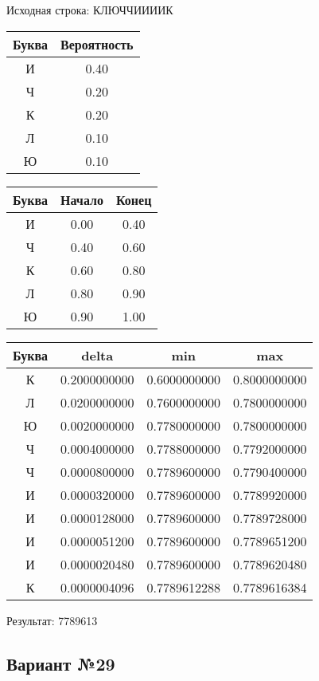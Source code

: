 \documentclass[a4paper, 12pt]{article}
\begin{document}
Исходная строка: КЛЮЧЧИИИИК\
\begin{center}
 \begin{tabular}{ |c|c| } 
  \hline
     Буква & Вероятность \\ \hline
И & 0.40\\\hline
Ч & 0.20\\\hline
К & 0.20\\\hline
Л & 0.10\\\hline
Ю & 0.10
\\ \hline \end{tabular}
\end{center}
\begin{center}
 \begin{tabular}{ |c|c|c| } 
  \hline
     Буква & Начало & Конец \\ \hline
И & 0.00 & 0.40\\\hline
Ч & 0.40 & 0.60\\\hline
К & 0.60 & 0.80\\\hline
Л & 0.80 & 0.90\\\hline
Ю & 0.90 & 1.00
\\ \hline \end{tabular}
\end{center}
\begin{center}
 \begin{tabular}{ |c|c|c|c| } 
  \hline
     Буква & delta & min & max \\ \hline
К & 0.2000000000 & 0.6000000000 & 0.8000000000\\\hline
Л & 0.0200000000 & 0.7600000000 & 0.7800000000\\\hline
Ю & 0.0020000000 & 0.7780000000 & 0.7800000000\\\hline
Ч & 0.0004000000 & 0.7788000000 & 0.7792000000\\\hline
Ч & 0.0000800000 & 0.7789600000 & 0.7790400000\\\hline
И & 0.0000320000 & 0.7789600000 & 0.7789920000\\\hline
И & 0.0000128000 & 0.7789600000 & 0.7789728000\\\hline
И & 0.0000051200 & 0.7789600000 & 0.7789651200\\\hline
И & 0.0000020480 & 0.7789600000 & 0.7789620480\\\hline
К & 0.0000004096 & 0.7789612288 & 0.7789616384
\\ \hline \end{tabular}
\end{center}
Результат: 7789613
\pagebreak
\subsection{Вариант №29}
\end{document}
